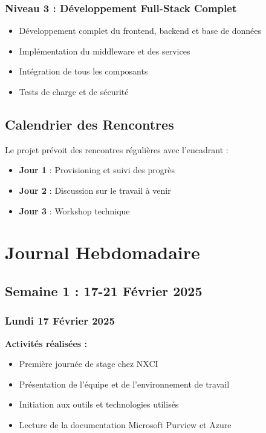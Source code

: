 \documentclass[12pt,a4paper]{article}
\begin{document}
\subsubsection{Niveau 3 : Développement Full-Stack Complet}
\begin{itemize}
    \item Développement complet du frontend, backend et base de données
    \item Implémentation du middleware et des services
    \item Intégration de tous les composants
    \item Tests de charge et de sécurité
\end{itemize}

\subsection{Calendrier des Rencontres}
Le projet prévoit des rencontres régulières avec l'encadrant :
\begin{itemize}
    \item \textbf{Jour 1} : Provisioning et suivi des progrès
    \item \textbf{Jour 2} : Discussion sur le travail à venir
    \item \textbf{Jour 3} : Workshop technique
\end{itemize}

\section{Journal Hebdomadaire}

\clearpage
\subsection{Semaine 1 : 17-21 Février 2025}

\subsubsection{Lundi 17 Février 2025}
\textbf{Activités réalisées :}
\begin{itemize}
    \item Première journée de stage chez NXCI
    \item Présentation de l'équipe et de l'environnement de travail
    \item Initiation aux outils et technologies utilisés
    \item Lecture de la documentation Microsoft Purview et Azure
\end{itemize}
\end{document}
